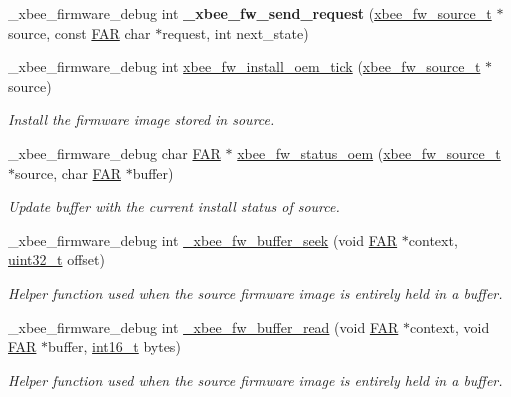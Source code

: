 \begin{DoxyCompactItemize}
\+\_\+xbee\+\_\+firmware\+\_\+debug int {\bfseries \+\_\+xbee\+\_\+fw\+\_\+send\+\_\+request} (\hyperlink{structxbee__fw__source__t}{xbee\+\_\+fw\+\_\+source\+\_\+t} $\ast$source, const \hyperlink{group__hal_gaef060b3456fdcc093a7210a762d5f2ed}{F\+AR} char $\ast$request, int next\+\_\+state)
\item 
\+\_\+xbee\+\_\+firmware\+\_\+debug int \hyperlink{group__xbee__firmware_gaea52642560ef68878fbca44e81df2be8}{xbee\+\_\+fw\+\_\+install\+\_\+oem\+\_\+tick} (\hyperlink{structxbee__fw__source__t}{xbee\+\_\+fw\+\_\+source\+\_\+t} $\ast$source)
\begin{DoxyCompactList}\small\item\em Install the firmware image stored in {\itshape source}. \end{DoxyCompactList}\item 
\+\_\+xbee\+\_\+firmware\+\_\+debug char \hyperlink{group__hal_gaef060b3456fdcc093a7210a762d5f2ed}{F\+AR} $\ast$ \hyperlink{group__xbee__firmware_ga0198db687345929eece03335ea1c7701}{xbee\+\_\+fw\+\_\+status\+\_\+oem} (\hyperlink{structxbee__fw__source__t}{xbee\+\_\+fw\+\_\+source\+\_\+t} $\ast$source, char \hyperlink{group__hal_gaef060b3456fdcc093a7210a762d5f2ed}{F\+AR} $\ast$buffer)
\begin{DoxyCompactList}\small\item\em Update {\itshape buffer} with the current install status of {\itshape source}. \end{DoxyCompactList}\item 
\+\_\+xbee\+\_\+firmware\+\_\+debug int \hyperlink{group__xbee__firmware_ga86a474f683ca3239ddea7b6414a6c555}{\+\_\+xbee\+\_\+fw\+\_\+buffer\+\_\+seek} (void \hyperlink{group__hal_gaef060b3456fdcc093a7210a762d5f2ed}{F\+AR} $\ast$context, \hyperlink{group__hal__dos_ga09a1e304d66d35dd47daffee9731edaa}{uint32\+\_\+t} offset)
\begin{DoxyCompactList}\small\item\em Helper function used when the source firmware image is entirely held in a buffer. \end{DoxyCompactList}\item 
\+\_\+xbee\+\_\+firmware\+\_\+debug int \hyperlink{group__xbee__firmware_ga3e528e574ae73a5f8bbc8b2783f04c4f}{\+\_\+xbee\+\_\+fw\+\_\+buffer\+\_\+read} (void \hyperlink{group__hal_gaef060b3456fdcc093a7210a762d5f2ed}{F\+AR} $\ast$context, void \hyperlink{group__hal_gaef060b3456fdcc093a7210a762d5f2ed}{F\+AR} $\ast$buffer, \hyperlink{group__hal__dos_ga2140805d08462d474b82ddc8d1c2f3e6}{int16\+\_\+t} bytes)
\begin{DoxyCompactList}\small\item\em Helper function used when the source firmware image is entirely held in a buffer. \end{DoxyCompactList}\item 

\end{DoxyCompactItemize}
